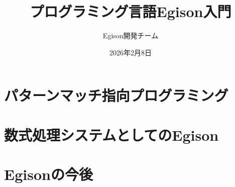 \documentclass[b5paper,papersize,openany]{jsbook}
\title{プログラミング言語Egison入門}
\author{Egison開発チーム}
\date{2026年2月8日}
\theoremstyle{definition}
\begin{document}
\frontmatter

\maketitle

\setcounter{section}{0}
\setcounter{footnote}{0}


\tableofcontents

\mainmatter

\setcounter{section}{0}


\part{パターンマッチ指向プログラミング}\label{part-pmo}











%





\part{数式処理システムとしてのEgison}\label{part-cas}













\part{Egisonの今後}



\appendix





%

%

%

\backmatter




\printindex
\end{document}

